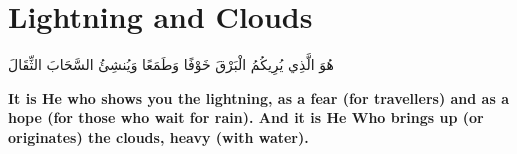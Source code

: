 \chapter{Lightning and Clouds}
\begin{center}
    {\Huge    
        \begin{Arabic}
            هُوَ الَّذِي يُرِيكُمُ الْبَرْقَ خَوْفًا وَطَمَعًا وَيُنشِئُ السَّحَابَ الثِّقَالَ
        \end{Arabic}
    }    
\end{center}
\vspace*{\fill}
\vspace{3cm}
\begin{center}
    \Large \textbf{It is He who shows you the lightning, as a fear (for travellers) and as a hope (for those who wait for rain). And it is He Who brings up (or originates) the clouds, heavy (with water).}
\end{center}
